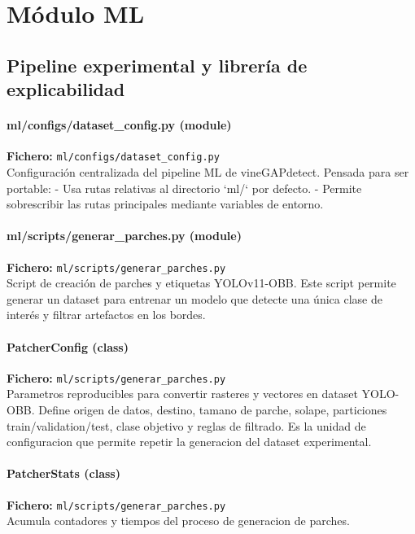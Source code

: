\chapter{Módulo ML}


\section{Pipeline experimental y librería de explicabilidad}
\subsubsection*{ml/configs/dataset\_config.py (module)}
\noindent\textbf{Fichero:} \texttt{ml/configs/dataset\_config.py}\\
Configuración centralizada del pipeline ML de vineGAPdetect. Pensada para ser portable: - Usa rutas relativas al directorio `ml/` por defecto. - Permite sobrescribir las rutas principales mediante variables de entorno.


\subsubsection*{ml/scripts/generar\_parches.py (module)}
\noindent\textbf{Fichero:} \texttt{ml/scripts/generar\_parches.py}\\
Script de creación de parches y etiquetas YOLOv11-OBB. Este script permite generar un dataset para entrenar un modelo que detecte una única clase de interés y filtrar artefactos en los bordes.


\subsubsection*{PatcherConfig (class)}
\noindent\textbf{Fichero:} \texttt{ml/scripts/generar\_parches.py}\\
Parametros reproducibles para convertir rasteres y vectores en dataset YOLO-OBB. Define origen de datos, destino, tamano de parche, solape, particiones train/validation/test, clase objetivo y reglas de filtrado. Es la unidad de configuracion que permite repetir la generacion del dataset experimental.


\subsubsection*{PatcherStats (class)}
\noindent\textbf{Fichero:} \texttt{ml/scripts/generar\_parches.py}\\
Acumula contadores y tiempos del proceso de generacion de parches.



